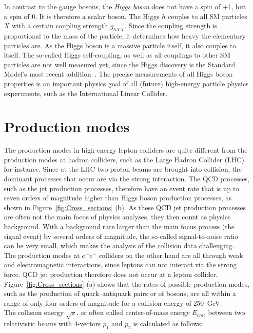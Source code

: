 In contrast to the gauge bosons, the \textit{Higgs boson} does not have a spin of +1, but a spin of 0.
It is therefore a scalar boson.
The Higgs $h$ couples to all SM particles $X$ with a certain coupling strength $g_{hXX}$.
Since the coupling strength is proportional to the mass of the particle, it determines how heavy the elementary particles are.
As the Higgs boson is a massive particle itself, it also couples to itself.
The so-called Higgs self-coupling, as well as all couplings to other SM particles are not well measured yet, since the Higgs discovery is the Standard Model's most recent addition~\cite{Higgs,Higgs2}.
The precise measurements of all Higgs boson properties is an important physics goal of all (future) high-energy particle physics experiments, such as the International Linear Collider. 

\section{Production modes}
\label{Production_modes}
The production modes in high-energy lepton colliders are quite different from the production modes at hadron colliders, such as the Large Hadron Collider (LHC) for instance.
Since at the LHC two proton beams are brought into collision, the dominant processes that occur are via the strong interaction.
The QCD processes, such as the jet production processes, therefore have an event rate that is up to seven orders of magnitude higher than Higgs boson production processes, as shown in Figure~\ref{fig:Cross_sections} (b).
As these QCD jet production processes are often not the main focus of physics analyses, they then count as physics background.
With a background rate larger than the main focus process (the signal event) by several orders of magnitude, the so-called signal-to-noise ratio can be very small, which makes the analysis of the collision data challenging.
\\The production modes at $e^+e^-$ colliders on the other hand are all through weak and electromagnetic interactions, since leptons can not interact via the strong force.
QCD jet production therefore does not occur at a lepton collider.
Figure~\ref{fig:Cross_sections} (a) shows that the rates of possible production modes, such as the production of quark--antiquark pairs or of bosons, are all within a range of only four orders of magnitude for a collision energy of \SI{250}{\GeV}.
\\The collision energy $\sqrt{s}$, or often called center-of-mass energy $E_{cm}$, between two relativistic beams with 4-vectors $p_1$ and $p_2$ is calculated as follows:
